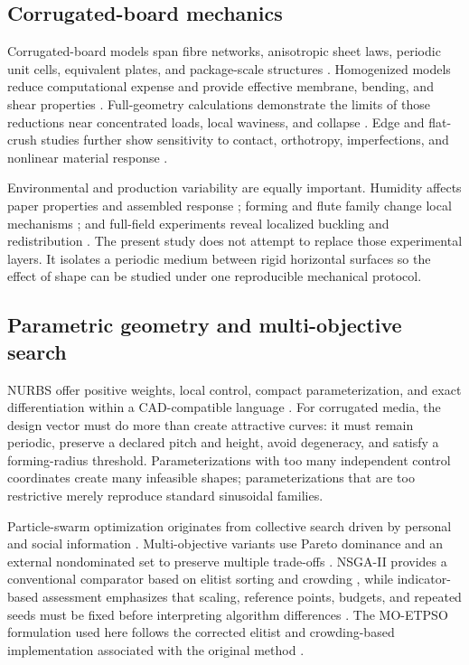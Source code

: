 \documentclass[11pt]{article}
\begin{document}
\subsection{Corrugated-board mechanics}

Corrugated-board models span fibre networks, anisotropic sheet laws, periodic unit cells, equivalent plates, and package-scale structures \citep{Simon2021,Beex2009,Stenberg2001,Stenberg2003}. Homogenized models reduce computational expense and provide effective membrane, bending, and shear properties \citep{Talbi2009,Garbowski2021Shear,Park2020Equivalent}. Full-geometry calculations demonstrate the limits of those reductions near concentrated loads, local waviness, and collapse \citep{Garbowski2021Full,Garbowski2022Bending}. Edge and flat-crush studies further show sensitivity to contact, orthotropy, imperfections, and nonlinear material response \citep{HajAli2009,Park2020Edge,Park2021Flat}.

Environmental and production variability are equally important. Humidity affects paper properties and assembled response \citep{Navaranjan2013}; forming and flute family change local mechanisms \citep{DiRusso2023}; and full-field experiments reveal localized buckling and redistribution \citep{Viguie2011,Viguie2013}. The present study does not attempt to replace those experimental layers. It isolates a periodic medium between rigid horizontal surfaces so the effect of shape can be studied under one reproducible mechanical protocol.

\subsection{Parametric geometry and multi-objective search}

NURBS offer positive weights, local control, compact parameterization, and exact differentiation within a CAD-compatible language \citep{Piegl1997,Hughes2005}. For corrugated media, the design vector must do more than create attractive curves: it must remain periodic, preserve a declared pitch and height, avoid degeneracy, and satisfy a forming-radius threshold. Parameterizations with too many independent control coordinates create many infeasible shapes; parameterizations that are too restrictive merely reproduce standard sinusoidal families.

Particle-swarm optimization originates from collective search driven by personal and social information \citep{Kennedy1995}. Multi-objective variants use Pareto dominance and an external nondominated set to preserve multiple trade-offs \citep{Coello2004}. NSGA-II provides a conventional comparator based on elitist sorting and crowding \citep{Deb2002}, while indicator-based assessment emphasizes that scaling, reference points, budgets, and repeated seeds must be fixed before interpreting algorithm differences \citep{Zitzler2003,Deb2001}. The MO-ETPSO formulation used here follows the corrected elitist and crowding-based implementation associated with the original method \citep{Fitas2024MOETPSO}.
\end{document}
